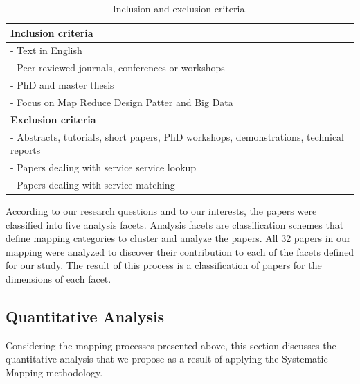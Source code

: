 \begin{table}\centering \small
\begin{tabular}{|l|} \hline
\textbf{Inclusion criteria}		\\ \hline\hline
- Text in English								\\ \hline
- Peer reviewed journals, conferences or workshops	\\ \hline
- PhD and master thesis	\\ \hline
- Focus on Map Reduce Design Patter and Big Data				\\ \hline\hline
\textbf{Exclusion criteria}		\\ \hline\hline
- Abstracts, tutorials, short papers, PhD workshops, demonstrations, technical reports		\\ \hline
- Papers dealing with service service lookup		\\ \hline
- Papers dealing with service matching 	\\ \hline
\end{tabular}
\caption{\label{table:criteria} Inclusion and exclusion criteria.}
\end{table}


According to our research questions and to our interests, the papers were classified into five analysis facets. 
Analysis facets are classification schemes  that define mapping categories to cluster and analyze the papers. 
All 32 papers in our mapping were analyzed to discover their contribution to
each of the facets defined for our study.
The result of this process is a classification of papers for the dimensions of each facet.


\subsection{Quantitative Analysis}


Considering the mapping processes presented above, this
section discusses the quantitative analysis that we propose as a result of
applying the Systematic Mapping methodology.  

